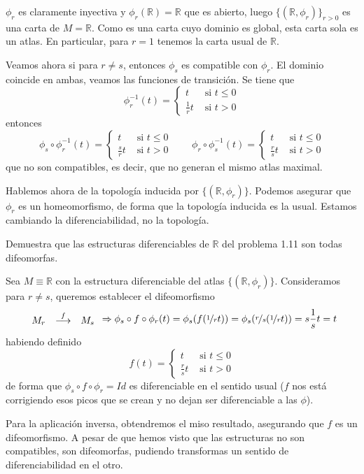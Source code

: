 \begin{sol}
   $\phi_r$ es claramente inyectiva y $\phi_r(\mathbb R) = \mathbb R$ que es abierto, luego  $\{(\mathbb R, \phi_r)\}_{r>0}$ es una carta de $M=\mathbb R$. Como es una carta cuyo dominio es global, esta carta sola es un atlas. En particular, para $r=1$ tenemos la carta usual de $\mathbb R$. 

   Veamos ahora si para $r \neq s$, entonces $\phi_s$ es compatible con $\phi_r$. El dominio coincide en ambas, veamos las funciones de transici\'on. Se tiene que 
    $$\phi_r^{-1}(t) = \begin{cases}
t & \text{ si } t \leq  0\\
\frac{1}{r} t & \text{ si } t > 0 
\end{cases}$$entonces
   $$\phi_s \circ \phi_r^{-1}(t) = \begin{cases}
t & \text{ si } t \leq  0\\
\frac{s}{r}t & \text{ si } t > 0 
\end{cases}  \qquad \phi_r \circ \phi_s^{-1}(t) =\begin{cases}
t & \text{ si } t \leq  0\\
\frac{r}{s}t & \text{ si } t > 0 
\end{cases} $$
que no son compatibles, es decir, que no generan el mismo atlas maximal.

  Hablemos ahora de la topolog\'ia inducida por $\{(\mathbb R, \phi_r)\}$. Podemos asegurar que $\phi_r$ es un homeomorfismo, de forma que la topolog\'ia inducida es la usual. Estamos cambiando la diferenciabilidad, no la topolog\'ia. 
\end{sol}
\begin{ejer}
    [1.19] Demuestra que las estructuras diferenciables de $\mathbb R$ del problema 1.11 son todas difeomorfas.
\end{ejer}
\begin{sol}
    Sea $M \equiv \mathbb R$ con la estructura diferenciable del atlas $\{(\mathbb R, \phi_r)\}$. Consideramos para $r \neq s$, queremos establecer el difeomorfismo
    $$\begin{array}{rcl}
         M_r &\overset{f}{\longrightarrow} & M_s  \\
    \end{array} \Rightarrow \phi_s \circ f \circ \phi_r (t) = \phi_s(f(\nicefrac{1}{r}t)) =\phi_s(\nicefrac{r}{s}(\nicefrac{1}{r}t)) = s \dfrac{1}{s} t =t$$
    habiendo definido $$f(t)=\begin{cases}
        t & \text{ si } t \leq 0 \\ \frac{r}{s} t & \text{ si } t>0
    \end{cases}$$
     de forma que $\phi_s \circ f \circ \phi_r = Id$ es diferenciable en el sentido usual ($f$ nos est\'a corrigiendo esos picos que se crean y no dejan ser diferenciable a las $\phi$).

     Para la aplicaci\'on inversa, obtendremos el miso resultado, asegurando que $f$ es un difeomorfismo. A pesar de que hemos visto que las estructuras no son compatibles, son difeomorfas, pudiendo transformas un sentido de diferenciabilidad en el otro. 
\end{sol}

